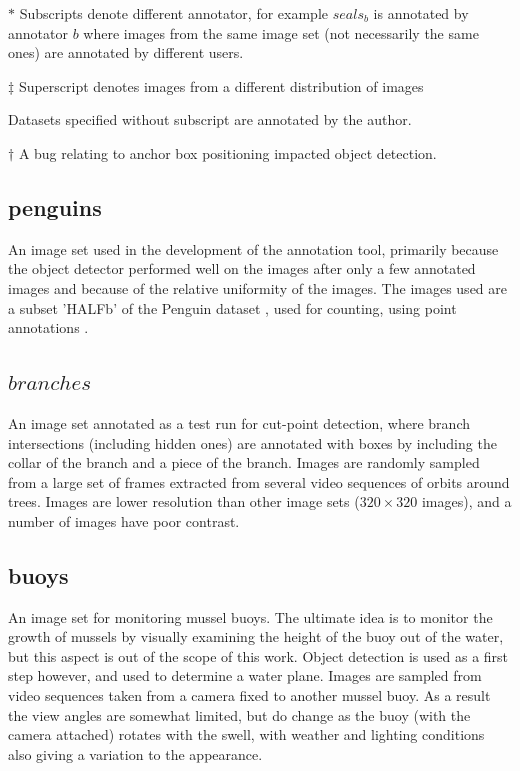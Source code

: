 \begin{threeparttable}[phtb]
\begin{tabular}{lllllll}
\bottomrule
\end{tabular}
\begin{tablenotes}
\small
\item $*$ Subscripts denote different annotator, for example $seals_b$ is annotated by annotator $b$ where images from the same image set (not necessarily the same ones) are annotated by different users.  
\item $\ddagger$ Superscript denotes images from a different distribution of images
\item Datasets specified without subscript are annotated by the author.
\item $\dagger$ A bug relating to anchor box positioning impacted object detection. 
\end{tablenotes}
\end{threeparttable}


\subsection{penguins}
An image set used in the development of the annotation tool, primarily because the object detector performed well on the images after only a few annotated images and because of the relative uniformity of the images. The images used are a subset 'HALFb'  of the Penguin dataset \cite{PenguinData}, used for counting, using point annotations \cite{Arteta2016}. 
\subsection{$branches$}
An image set annotated as a test run for cut-point detection, where branch intersections (including hidden ones) are annotated with boxes by including the collar of the branch and a piece of the branch. Images are randomly sampled from a large set of frames extracted from several video sequences of orbits around trees. Images are lower resolution than other image sets ($ 320\times320 $ images), and a number of images have poor contrast.

\subsection{buoys}
An image set for monitoring mussel buoys. The ultimate idea is to monitor the growth of mussels by visually examining the height of the buoy out of the water, but this aspect is out of the scope of this work. Object detection is used as a first step however, and used to determine a water plane. Images are sampled from video sequences taken from a camera fixed to another mussel buoy. As a result the view angles are somewhat limited, but do change as the buoy (with the camera attached) rotates with the swell, with weather and lighting conditions also giving a variation to the appearance. 

